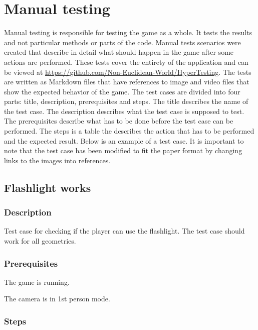 \section{Manual testing} \label{sec:manual_testing}
Manual testing is responsible for testing the game as a whole.
It tests the results and not particular methods or parts of the code.
Manual tests scenarios were created that describe in detail what should happen in the game after some actions are performed.
These tests cover the entirety of the application and can be viewed at \url{https://github.com/Non-Euclidean-World/HyperTesting}.
The tests are written as Markdown files that have references to image and video files that show the expected behavior of the game.
The test cases are divided into four parts: title, description, prerequisites and steps.
The title describes the name of the test case.
The description describes what the test case is supposed to test.
The prerequisites describe what has to be done before the test case can be performed.
The steps is a table the describes the action that has to be performed and the expected result.
Below is an example of a test case. 
It is important to note that the test case has been modified to fit the paper format by changing links to the images into references.


\subsection*{Flashlight works}\label{flashlight-works}

\subsubsection*{Description}\label{description}

Test case for checking if the player can use the flashlight. The test
case should work for all geometries.

\subsubsection*{Prerequisites}\label{prerequisites}

The game is running.

The camera is in 1st person mode.

\subsubsection*{Steps}\label{steps}

